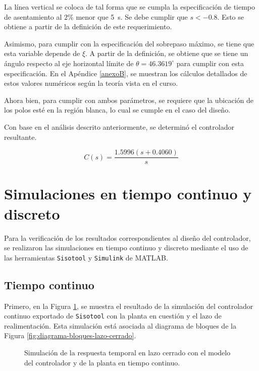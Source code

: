 La línea vertical se coloca de tal forma que se cumpla la especificación de tiempo de asentamiento al $2\%$ menor que \SI{5}{\second}.
Se debe cumplir que $s < -0.8$.
Esto se obtiene a partir de la definición de este requerimiento.

Asimismo, para cumplir con la especificación del sobrepaso máximo, se tiene que esta variable depende de $\xi$.
A partir de la definición, se obtiene que se tiene un ángulo respecto al eje horizontal límite de $\theta = 46.3619^\circ$ para cumplir con esta especificación.
En el Apéndice \ref{anexoB}, se muestran los cálculos detallados de estos valores numéricos según la teoría vista en el curso.

Ahora bien, para cumplir con ambos parámetros, se requiere que la ubicación de los polos esté en la región blanca, lo cual se cumple en el caso del diseño.

Con base en el análisis descrito anteriormente, se determinó el controlador resultante.

\begin{equation} \label{eq:controlador_continuo}
    C(s) = \frac{1.5996 \left(s+0.4060\right)}{s}
\end{equation}

\section{Simulaciones en tiempo continuo y discreto}

Para la verificación de los resultados correspondientes al diseño del controlador, se realizaron las simulaciones en tiempo continuo y discreto mediante el uso de las herramientas \texttt{Sisotool} y \texttt{Simulink} de MATLAB.

\subsection{Tiempo continuo}

Primero, en la Figura \ref{fig:respuesta-temporal-continua}, se muestra el resultado de la simulación del controlador continuo exportado de \texttt{Sisotool} con la planta en cuestión y el lazo de realimentación.
Esta simulación está asociada al diagrama de bloques de la Figura \ref{fig:diagrama-bloques-lazo-cerrado}.

\begin{figure}[htbp]
    \centering
    \caption{Simulación de la respuesta temporal en lazo cerrado con el modelo del controlador y de la planta en tiempo continuo.}
    \label{fig:respuesta-temporal-continua}
\end{figure}

